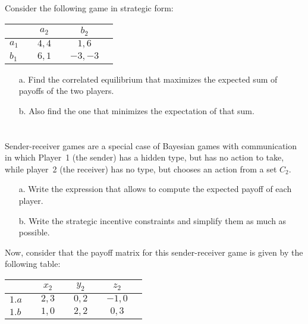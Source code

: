 \documentclass{../ape}
\begin{document}

\section{}
Consider the following game in strategic form:

	\begin{center}
		\begin{tabular}[h!]{l|ccccc}
			&& $a_2$ && $b_2$ & \\
			\hline
			$a_1$ && $4,4$ && $1,6$ & \\
			$b_1$ && $6,1$ && $-3,-3$ & 
		\end{tabular} 
	\end{center}

\begin{enumerate}
	\item[a.] Find the correlated equilibrium that maximizes the expected sum of payoffs of the two players.
	\item[b.] Also find the one that minimizes the expectation of that sum.
\end{enumerate}

\begin{solution}

\end{solution}

\section{}
Sender-receiver games are a special case of Bayesian games with communication in which Player~1 (the sender) has a hidden type, but has no action to take, while player~2 (the receiver) has no type, but chooses an action from a set $C_2$.

\begin{enumerate}
	\item[a.] Write the expression that allows to compute the expected payoff of each player.
	\item[b.] Write the strategic incentive constraints and simplify them as much as possible.
\end{enumerate}

Now, consider that the payoff matrix for this sender-receiver game is given by the following table:

\begin{center}
	\begin{tabular}[h!]{l|ccccccc}
		&& $x_2$ && $y_2$ && $z_2$ & \\
		\hline
		$1.a$ && $2,3$ && $0,2$ && $-1,0$ & \\
		$1.b$ && $1,0$ && $2,2$ && $0,3$ & 
	\end{tabular} 
\end{center}
	
\end{document}
